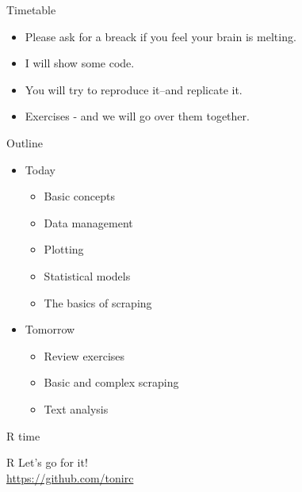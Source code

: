 \documentclass{beamer}
\begin{document}
 \begin{frame}{Timetable}
\begin{itemize}[<+->]
\item Please ask for a breack if you feel your brain is melting.
\item I will show some code.
\item You will try to reproduce it--and replicate it.
\item Exercises - and we will go over them together.
   \end{itemize} 
\end{frame}

\begin{frame}{Outline}
\begin{itemize}
   \item Today
   \begin{itemize}
      \item Basic concepts
      \item Data management
      \item Plotting
      \item Statistical models
      \item The basics of scraping
      \end{itemize}
  \item Tomorrow
        \begin{itemize}
   \item Review exercises
   \item Basic and complex scraping
   \item Text analysis
\end{itemize}
\end{itemize}
\end{frame}

\begin{frame}{R time}
\begin{block}{R} 
Let's go for it! \\
\url{https://github.com/tonirc} 
\end{block}
\end{frame}



  \maketitle
\end{document}
